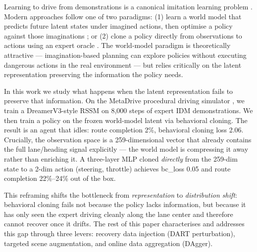 \documentclass{article}
\begin{document}
Learning to drive from demonstrations is a canonical imitation learning
problem \citep{pomerleau1989alvinn}. Modern approaches follow one of two
paradigms: (1) learn a world model that predicts future latent states under
imagined actions, then optimise a policy against those imaginations
\citep{hafner2023dreamerv3,wu2023daydreamer}; or (2) clone a policy
directly from observations to actions using an expert oracle
\citep{codevilla2018conditional,chen2022learning}. The world-model paradigm
is theoretically attractive --- imagination-based planning can explore
policies without executing dangerous actions in the real environment ---
but relies critically on the latent representation preserving the
information the policy needs.

In this work we study what happens when the latent representation fails to
preserve that information. On the MetaDrive procedural driving simulator
\citep{li2022metadrive}, we train a DreamerV3-style RSSM
\citep{hafner2019rssm} on 8{,}000 steps of expert IDM demonstrations.
We then train a policy on the frozen world-model latent via behavioral
cloning. The result is an agent that idles: route completion 2\%,
behavioral cloning loss 2.06. Crucially, the observation space is
a 259-dimensional vector that already contains the full lane/heading
signal explicitly --- the world model is compressing it away rather
than enriching it. A three-layer MLP cloned \emph{directly} from
the 259-dim state to a 2-dim action (steering, throttle) achieves
bc\_loss 0.05 and route completion 22\%--24\% out of the box.

This reframing shifts the bottleneck from \emph{representation} to
\emph{distribution shift}: behavioral cloning fails not because the
policy lacks information, but because it has only seen the expert
driving cleanly along the lane center and therefore cannot recover
once it drifts. The rest of this paper characterises and addresses this
gap through three levers: recovery data injection (DART perturbation),
targeted scene augmentation, and online data aggregation (DAgger).
\end{document}
